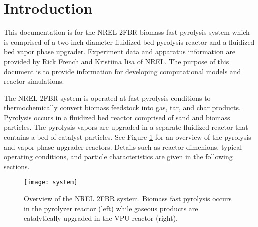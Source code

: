 
\section{Introduction}

This documentation is for the NREL 2FBR biomass fast pyrolysis system which is comprised of a two-inch diameter fluidized bed pyrolysis reactor and a fluidized bed vapor phase upgrader. Experiment data and apparatus information are provided by Rick French and Kristiina Iisa of NREL. The purpose of this document is to provide information for developing computational models and reactor simulations.

The NREL 2FBR system is operated at fast pyrolysis conditions to thermochemically convert biomass feedstock into gas, tar, and char products. Pyrolysis occurs in a fluidized bed reactor comprised of sand and biomass particles. The pyrolysis vapors are upgraded in a separate fluidized reactor that contains a bed of catalyst particles. See Figure \ref{fig:system} for an overview of the pyrolysis and vapor phase upgrader reactors. Details such as reactor dimenions, typical operating conditions, and particle characteristics are given in the following sections.

\begin{figure}[H]
    \centering
    \texttt{[image: system]}
    \caption{Overview of the NREL 2FBR system. Biomass fast pyrolysis occurs in the pyrolyzer reactor (left) while gaseous products are catalytically upgraded in the VPU reactor (right).}
    \label{fig:system}
\end{figure}
